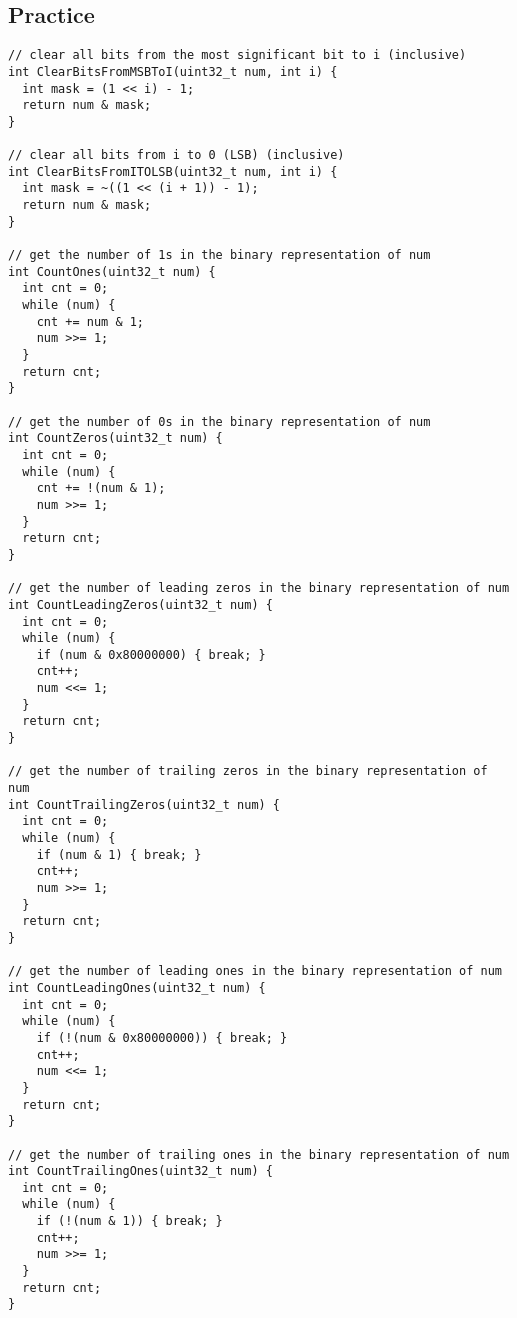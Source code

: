 \subsection{Practice}
\begin{lstlisting}
// clear all bits from the most significant bit to i (inclusive)
int ClearBitsFromMSBToI(uint32_t num, int i) {
  int mask = (1 << i) - 1;
  return num & mask;
}

// clear all bits from i to 0 (LSB) (inclusive)
int ClearBitsFromITOLSB(uint32_t num, int i) {
  int mask = ~((1 << (i + 1)) - 1);
  return num & mask;
}

// get the number of 1s in the binary representation of num
int CountOnes(uint32_t num) {
  int cnt = 0;
  while (num) {
    cnt += num & 1;
    num >>= 1;
  }
  return cnt;
}

// get the number of 0s in the binary representation of num
int CountZeros(uint32_t num) {
  int cnt = 0;
  while (num) {
    cnt += !(num & 1);
    num >>= 1;
  }
  return cnt;
}

// get the number of leading zeros in the binary representation of num
int CountLeadingZeros(uint32_t num) {
  int cnt = 0;
  while (num) {
    if (num & 0x80000000) { break; }
    cnt++;
    num <<= 1;
  }
  return cnt;
}

// get the number of trailing zeros in the binary representation of num
int CountTrailingZeros(uint32_t num) {
  int cnt = 0;
  while (num) {
    if (num & 1) { break; }
    cnt++;
    num >>= 1;
  }
  return cnt;
}

// get the number of leading ones in the binary representation of num
int CountLeadingOnes(uint32_t num) {
  int cnt = 0;
  while (num) {
    if (!(num & 0x80000000)) { break; }
    cnt++;
    num <<= 1;
  }
  return cnt;
}

// get the number of trailing ones in the binary representation of num
int CountTrailingOnes(uint32_t num) {
  int cnt = 0;
  while (num) {
    if (!(num & 1)) { break; }
    cnt++;
    num >>= 1;
  }
  return cnt;
}
\end{lstlisting}